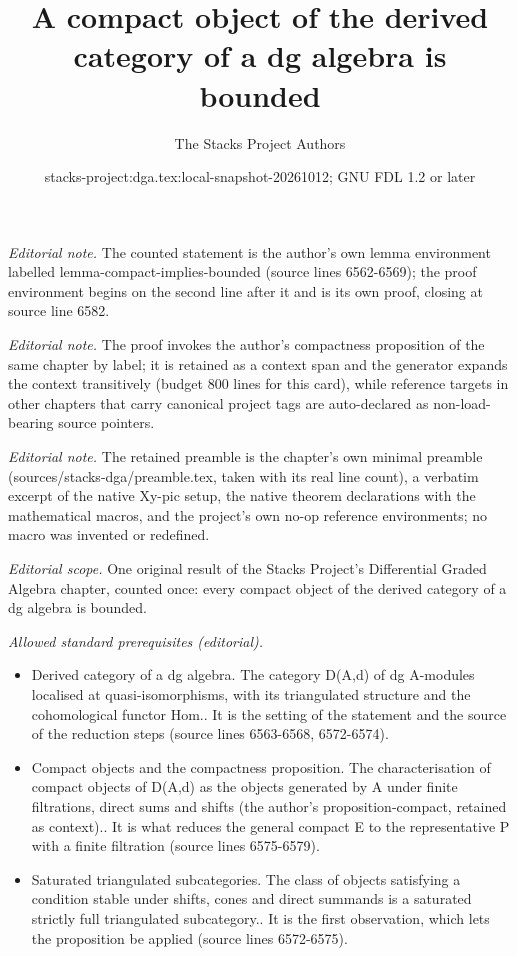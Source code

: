 \documentclass{stacks-project}
\title{A compact object of the derived category of a dg algebra is bounded}
\author{The Stacks Project Authors}
\date{stacks-project:dga.tex:local-snapshot-20261012; GNU FDL 1.2 or later}
\theoremstyle{plain}
\theoremstyle{definition}
\theoremstyle{remark}
\numberwithin{equation}{subsection}
\begin{document}
\maketitle
\noindent\textit{Editorial note.} The counted statement is the author's own lemma environment labelled lemma-compact-implies-bounded (source lines 6562-6569); the proof environment begins on the second line after it and is its own proof, closing at source line 6582.\par\medskip
\noindent\textit{Editorial note.} The proof invokes the author's compactness proposition of the same chapter by label; it is retained as a context span and the generator expands the context transitively (budget 800 lines for this card), while reference targets in other chapters that carry canonical project tags are auto-declared as non-load-bearing source pointers.\par\medskip
\noindent\textit{Editorial note.} The retained preamble is the chapter's own minimal preamble (sources/stacks-dga/preamble.tex, taken with its real line count), a verbatim excerpt of the native Xy-pic setup, the native theorem declarations with the mathematical macros, and the project's own no-op reference environments; no macro was invented or redefined.\par\medskip
\noindent\textit{Editorial scope.} One original result of the Stacks Project's Differential Graded Algebra chapter, counted once: every compact object of the derived category of a dg algebra is bounded.\par\medskip
\noindent\textit{Allowed standard prerequisites (editorial).}\begin{itemize}
\item Derived category of a dg algebra. The category D(A,d) of dg A-modules localised at quasi-isomorphisms, with its triangulated structure and the cohomological functor Hom.. It is the setting of the statement and the source of the reduction steps (source lines 6563-6568, 6572-6574).
\item Compact objects and the compactness proposition. The characterisation of compact objects of D(A,d) as the objects generated by A under finite filtrations, direct sums and shifts (the author's proposition-compact, retained as context).. It is what reduces the general compact E to the representative P with a finite filtration (source lines 6575-6579).
\item Saturated triangulated subcategories. The class of objects satisfying a condition stable under shifts, cones and direct summands is a saturated strictly full triangulated subcategory.. It is the first observation, which lets the proposition be applied (source lines 6572-6575).
\end{itemize}\medskip
\end{document}
